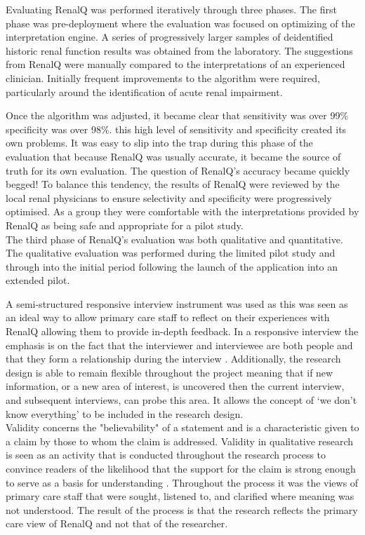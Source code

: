 \documentclass[11pt]{article}
\begin{document}
Evaluating RenalQ was performed iteratively through three phases. The first phase was pre-deployment where the evaluation was focused on optimizing of the interpretation engine. A series of progressively larger samples of deidentified historic renal function results was obtained from the laboratory. The suggestions from RenalQ were manually compared to the interpretations of an experienced clinician. Initially frequent improvements to the algorithm were required, particularly around the identification of acute renal impairment. 

Once the algorithm was adjusted, it became clear that sensitivity was over 99\% specificity was over 98\%. this high level of sensitivity and specificity created its own problems. It was easy to slip into the trap during this phase of the evaluation that because RenalQ was usually accurate, it became the source of truth for its own evaluation. The question of RenalQ's accuracy became quickly begged! To balance this tendency, the results of RenalQ were reviewed by the local renal physicians to ensure selectivity and specificity were progressively optimised. As a group they were comfortable with the interpretations provided by RenalQ as being safe and appropriate for a pilot study. \\ 

The third phase of RenalQ's evaluation was both qualitative and quantitative. The qualitative evaluation was performed during the limited pilot study and through into the initial period following the launch of the application into an extended pilot. 

A semi-structured responsive interview instrument was used as this was seen as an ideal way to allow primary care staff to reflect on their experiences with RenalQ allowing them to provide in-depth feedback. In a responsive interview the emphasis is on the fact that the interviewer and interviewee are both people and that they form a relationship during the interview \citep{rubin2011qualitative}. Additionally, the research design is able to remain flexible throughout the project meaning that if new information, or a new area of interest, is uncovered then the current interview, and subsequent interviews, can probe this area. It allows the concept of ‘we don’t know everything’ to be included in the research design.\\

Validity concerns the "believability" of a statement and is a characteristic given to a claim by those to whom the claim is addressed. Validity in qualitative research is seen as an activity that is conducted throughout the research process \citep{morse2002verification, kvale2009interviews} to convince readers of the likelihood that the support for the claim is strong enough to serve as a basis for understanding \citep{polkinghorne2007validity}. Throughout the process it was the views of primary care staff that were sought, listened to, and clarified where meaning was not understood. The result of the process is that the research reflects the primary care view of RenalQ and not that of the researcher.\\
\end{document}
